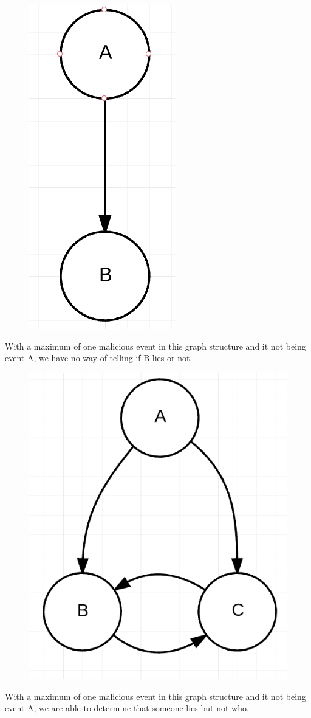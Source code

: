 \begin{figure}
	\centering
	\includegraphics{figures/GraphStructure_OneToOne}
\end{figure}
With a maximum of one malicious event in this graph structure and it not being event A, we have no way of telling if B lies or not.

\begin{figure}
	\centering
	\includegraphics{figures/GraphStructure_OneToTwo}
\end{figure}
With a maximum of one malicious event in this graph structure and it not being event A, we are able to determine that someone lies but not who.

